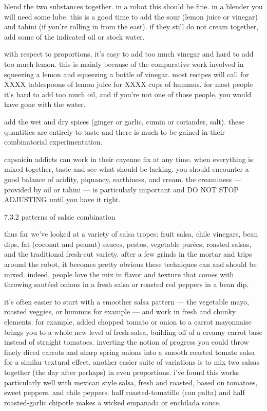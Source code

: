 blend the two substances together. in a robot this should be fine. in a blender you will need some lube. this is a good time to add the sour (lemon juice or vinegar) and tahini (if you're rolling in from the east). if they still do not cream together, add some of the indicated oil or stock water.

with respect to proportions, it's easy to add too much vinegar and hard to add too much lemon. this is mainly because of the comparative work involved in squeezing a lemon and squeezing a bottle of vinegar. most recipes will call for XXXX tablespoons of lemon juice for XXXX cups of hummus. for most people it's hard to add too much oil, and if you're not one of those people, you would have gone with the water.

add the wet and dry spices (ginger or garlic, cumin or coriander, salt). these quantities are entirely to taste and there is much to be gained in their combinatorial experimentation.

capsaicin addicts can work in their cayenne fix at any time. when everything is mixed together, taste and see what should be lacking. you should encounter a good balance of acidity, piquancy, earthiness, and cream. the creaminess --- provided by oil or tahini --- is particularly important and DO NOT STOP ADJUSTING until you have it right.

7.3.2  patterns of salsic combination

thus far we've looked at a variety of salsa tropes: fruit salsa, chile vinegars, bean dips, fat (coconut and peanut) sauces, pestos, vegetable pur\'{e}es, roasted salsas, and the traditional fresh-cut variety. after a few grinds in the mortar and trips around the robot, it becomes pretty obvious these techniques can and should be mixed. indeed, people love the mix in flavor and texture that comes with throwing saut\'{e}ed onions in a fresh salsa or roasted red peppers in a bean dip.

it's often easier to start with a smoother salsa pattern --- the vegetable mayo, roasted veggies, or hummus for example --- and work in fresh and chunky elements. for example, added chopped tomato or onion to a carrot mayonnaise brings you to a whole new level of fresh-salsa, building off of a creamy carrot base instead of straight tomatoes. inverting the notion of progress you could throw finely diced carrots and sharp spring onions into a smooth roasted tomato salsa for a similar textural effect.
	another easier suite of variations is to mix two salsas together (the day after perhaps) in even proportions. i've found this works particularly well with mexican style salsa, fresh and roasted, based on tomatoes, sweet peppers, and chile peppers. half roasted-tomatillo (con palta) and half roasted-garlic chipotle makes a wicked empanada or enchilada sauce.


